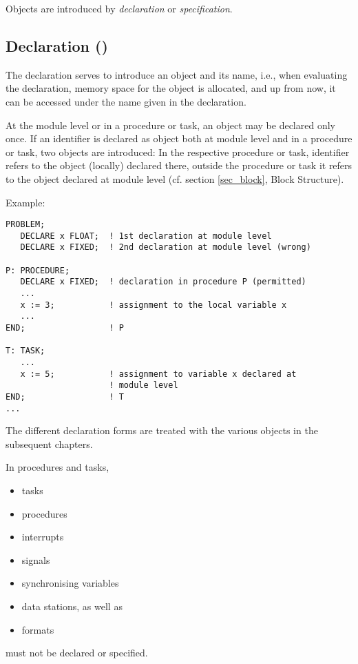 Objects are introduced by {\it declaration} or {\it specification}.

\subsection{Declaration ()}  %
\label{sec_dcl}

The declaration serves to introduce an object and its name, i.e., when
evaluating the declaration, memory space for the object is allocated, and
up from now, it can be accessed under the name given in the
declaration.

At the module level or in a procedure or task, an object may be declared
only once. If an identifier  is declared as object both at module level
and in a procedure or task, two objects are introduced: In the
respective procedure or task, identifier  refers to the object
(locally) declared there, outside the procedure or task it refers to the
object declared at module level (cf. section \ref{sec_block}, Block Structure).

Example:

\begin{lstlisting}
PROBLEM;
   DECLARE x FLOAT;  ! 1st declaration at module level
   DECLARE x FIXED;  ! 2nd declaration at module level (wrong)

P: PROCEDURE; 
   DECLARE x FIXED;  ! declaration in procedure P (permitted)
   ...     
   x := 3;           ! assignment to the local variable x
   ...         
END;                 ! P 

T: TASK;
   ...         
   x := 5;           ! assignment to variable x declared at
                     ! module level
END;                 ! T 
... 
\end{lstlisting}

The different declaration forms are treated with the various objects in
the subsequent chapters.

In procedures and tasks,
\begin{itemize}
\item tasks
\item procedures
\item interrupts
\item signals
\item synchronising variables
\item data stations, as well as
\item formats
\end{itemize}
must not be declared or specified.

